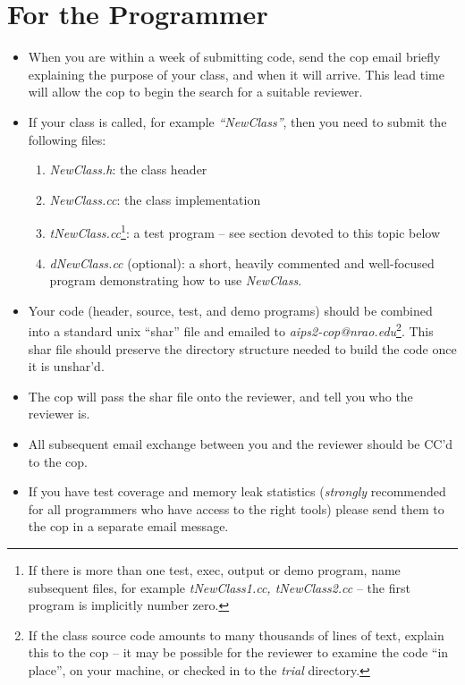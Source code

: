 \section{For the Programmer}
\begin{itemize}
  \item When you are within a week of submitting code, send the cop email   
        briefly explaining the purpose of your class, and when it will
        arrive.  This lead time will allow the cop to begin the search
        for a suitable reviewer.

  \item If your class is called, for example {\it ``NewClass''}, then you 
        need to submit the following files:
         \begin{enumerate}
           \item  {\it NewClass.h}: the class header
           \item  {\it NewClass.cc}: the class implementation
           \item  {\it tNewClass.cc}\footnote {If there is more than one
                  test, exec, output or demo program, name subsequent files,
                  for example {\it tNewClass1.cc, tNewClass2.cc} -- 
                  the first program  is implicitly  number zero.}: 
                  a test program -- see section devoted to this topic below
           \item  {\it dNewClass.cc} (optional):  a short, heavily commented
            and well-focused program demonstrating how to use {\it NewClass}.
         \end{enumerate}
  \item Your code (header, source, test, and demo programs) should be
        combined into a standard unix ``shar'' file and emailed to
        {\it aips2-cop@nrao.edu}\footnote{If the class source code
        amounts to many thousands of lines of text, explain this to the cop --
        it may be possible for the reviewer to examine the code ``in place'',
        on your machine, or checked in to the {\it trial} directory.}.
         This shar file should preserve the
        directory structure needed to build the code once it is unshar'd.
  \item The cop will pass the shar file onto the reviewer, and tell you
        who the reviewer is.
  \item All subsequent email exchange between you and the reviewer should
        be CC'd to the cop.
  \item If you have test coverage and memory leak statistics ({\em strongly}
        recommended for all programmers who have access to the right tools)
        please send them to the cop in a separate email message.
\end{itemize}
